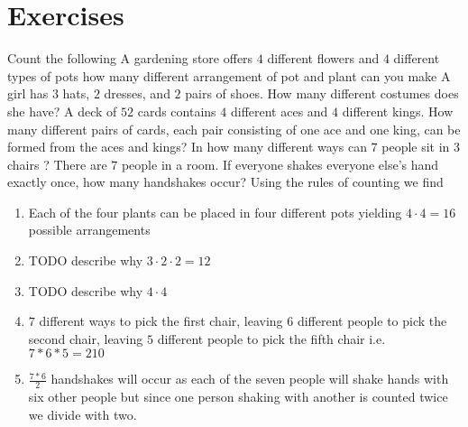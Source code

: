 \section{Exercises}
\begin{ExerciseList}

\Exercise Count the following
\Question A gardening store offers $4 $ different flowers and $4$ different types of pots how many different arrangement of pot and plant can you make
\Question A girl has $3$ hats, $2$ dresses, and $2$ pairs of shoes. How many different costumes does she have?
\Question A deck of $52$ cards contains $4$ different aces and $4$ different kings. How many different pairs of cards, each pair consisting of one ace and one king, can be formed from the aces and kings?
\Question In how many different ways can $7$ people sit in $3$ chairs ?
\Question There are $7$ people in a room. If everyone shakes everyone else's hand exactly once, how many handshakes occur? 
\Answer Using the rules of counting we find
\begin{enumerate}
\item \myindent Each of the four plants can be placed in four different pots yielding $4 \cdot 4 = 16$ possible arrangements
\item \myindent TODO describe why $3 \cdot 2 \cdot 2 = 12$
\item \myindent TODO describe why $4 \cdot 4$
\item \myindent $7$ different ways to pick the first chair, leaving $6$ different people to pick the second chair, leaving $5$ different people to pick the fifth chair i.e. $7*6*5 = 210$
\item \myindent $\frac{7*6}{2}$ handshakes will occur as each of the seven people will shake hands with six other people but since one person shaking with another is counted twice we divide with two.
\end{enumerate}

\end{ExerciseList}

